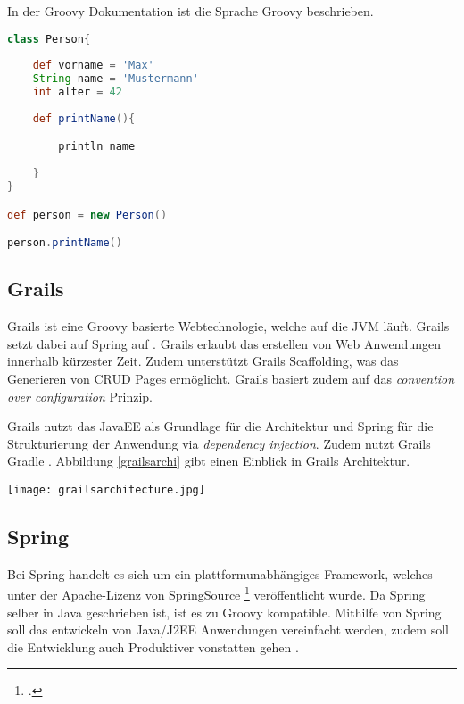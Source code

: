 In der Groovy Dokumentation \cite{groovylang2017} ist die Sprache Groovy beschrieben.

\begin{lstlisting}[language=Groovy,caption={Eine einfache Groovy Klasse}, label=listingGb]
class Person{ 
	
	def vorname = 'Max'
	String name = 'Mustermann'
	int alter = 42
	
	def printName(){

		println name
		
	}
}

def person = new Person()

person.printName()
\end{lstlisting}

\subsection{Grails}

Grails ist eine Groovy basierte Webtechnologie, welche auf die \ac{JVM} läuft. Grails setzt dabei auf Spring auf \cite{grails2017}. Grails erlaubt das erstellen von Web Anwendungen innerhalb kürzester Zeit. Zudem unterstützt Grails Scaffolding, was das Generieren von CRUD Pages ermöglicht. Grails basiert zudem auf das \textit{convention over configuration} Prinzip. 

Grails nutzt das JavaEE als Grundlage für die Architektur und Spring für die Strukturierung der Anwendung via \textit{dependency injection}. Zudem nutzt Grails Gradle \cite{grailsVogella2017}. Abbildung \ref{grailsarchi} gibt einen Einblick in Grails Architektur.

\begin{figure*}[h]
  \texttt{[image: grailsarchitecture.jpg]}
  \caption{Grails Architektur \protect\footnotemark}
  \label{grailsarchi}
\end{figure*}

\subsection{Spring}\label{spring}

Bei Spring handelt es sich um ein plattformunabhängiges Framework, welches unter der Apache-Lizenz von  SpringSource \footcite{https://spring.io/} veröffentlicht wurde. Da Spring selber in Java geschrieben ist, ist es zu Groovy kompatible. Mithilfe von Spring soll das entwickeln von Java/J2EE Anwendungen vereinfacht werden, zudem soll die Entwicklung auch Produktiver vonstatten gehen \cite[Seite 1]{johnson2005}. 


